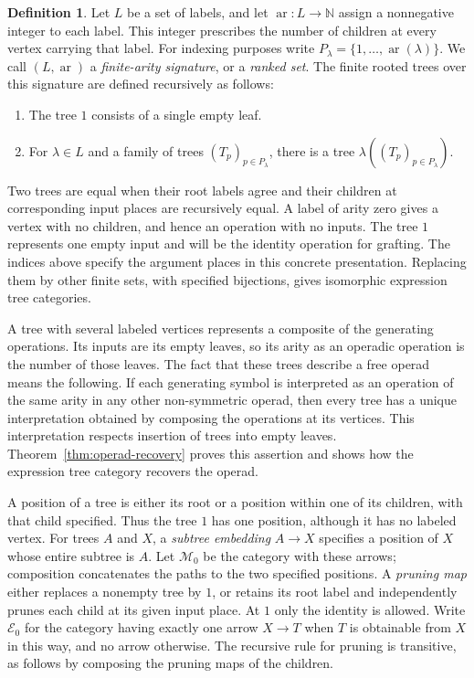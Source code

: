 \documentclass[11pt,a4paper]{article}
\theoremstyle{plain}
\theoremstyle{definition}
\newtheorem{definition}[theorem]{Definition}
\theoremstyle{remark}
\newcommand{\Ocat}{\mathcal M}
\newcommand{\Dcat}{\mathcal E}
\newcommand{\one}{1}
\begin{document}
\begin{definition}\label{def:ranked-set}
Let $L$ be a set of labels, and let
$\operatorname{ar}:L\to\mathbb N$ assign a nonnegative integer to
each label. This integer prescribes the number of children at every
vertex carrying that label. For indexing purposes write
$P_\lambda=\{1,\ldots,\operatorname{ar}(\lambda)\}$.
We call $(L,\operatorname{ar})$ a \emph{finite-arity signature},
or a \emph{ranked set}.
The finite rooted trees over this signature are defined recursively as follows:
\begin{enumerate}
\item The tree $\one$ consists of a single empty leaf.
\item For $\lambda\in L$ and a family of trees $(T_p)_{p\in P_\lambda}$,
there is a tree $\lambda((T_p)_{p\in P_\lambda})$.
\end{enumerate}
Two trees are equal when their root labels agree and their children
at corresponding input places are recursively equal. A label of
arity zero gives a vertex with no children, and hence an operation
with no inputs. The tree $\one$ represents one empty input and will
be the identity operation for grafting. The indices above specify
the argument places in this concrete presentation. Replacing them
by other finite sets, with specified bijections, gives isomorphic
expression tree categories.
\end{definition}

A tree with several labeled vertices represents a composite of the
generating operations. Its inputs are its empty leaves, so its
arity as an operadic operation is the number of those leaves.
The fact that these trees describe a free operad means the following.
If each generating symbol is interpreted as an operation of the same
arity in any other non-symmetric operad, then every tree has a unique
interpretation obtained by composing the operations at its vertices.
This interpretation respects insertion of trees into empty leaves.
Theorem~\ref{thm:operad-recovery} proves this assertion and shows how
the expression tree category recovers the operad.

A position of a tree is either its root or a position within one
of its children, with that child specified. Thus the tree $\one$
has one position, although it has no labeled vertex. For trees $A$
and $X$, a \emph{subtree embedding} $A\to X$ specifies
a position of $X$ whose entire subtree is $A$. Let $\Ocat_0$ be
the category with these arrows; composition concatenates the paths
to the two specified positions. A \emph{pruning map} either replaces a
nonempty tree by $\one$, or retains its root label and independently
prunes each child at its given input place. At $\one$ only the
identity is allowed. Write $\Dcat_0$ for the category having exactly one
arrow $X\to T$ when $T$ is obtainable from $X$ in this way, and
no arrow otherwise. The recursive rule for pruning is transitive,
as follows by composing the pruning maps of the children.
\end{document}
